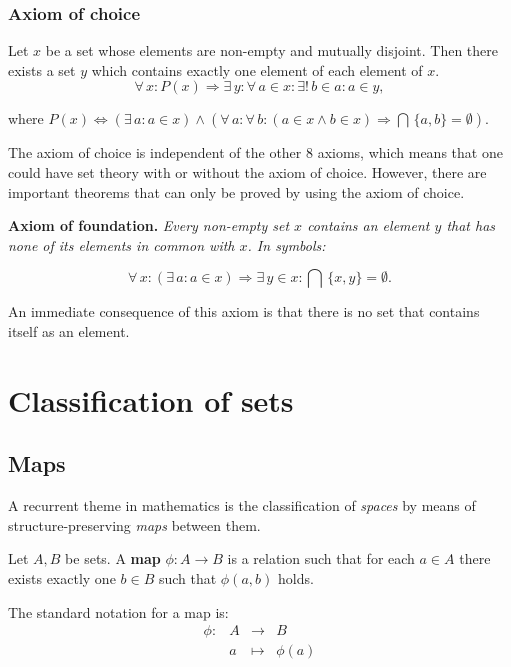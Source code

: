 \documentclass[root.tex]{subfiles}
\begin{document}
\subsection{Axiom of choice}
Let $x$ be a set whose elements are non-empty and mutually disjoint. Then there exists a set $y$ which contains exactly one element of each element of $x$.
$$
\forall \, x : P(x) \Rightarrow \exists \, y : \forall \, a \in x :\exists! \, b \in a : a \in y,
$$

where $P(x) \Leftrightarrow (\exists \,a : a \in x) \land (\forall \, a : \forall \, b : (a\in x \land b \in x) \Rightarrow \bigcap \, \{a,b\} = \emptyset )$.

\begin{remark}
The axiom of choice is independent of the other 8 axioms, which means that one could have set theory with or without the axiom of choice. However, there are important theorems that can only be proved by using the axiom of choice. 
\end{remark}

\textbf{Axiom of foundation.} \emph{Every non-empty set $x$ contains an element $y$ that has none of its elements in common with $x$. In symbols:}

$$
\forall \, x : (\exists \,a : a \in x) \Rightarrow \exists \, y \in x : \bigcap \, \{x,y\} = \emptyset .
$$

An immediate consequence of this axiom is that there is no set that contains itself as an element.\\

\chapter{Classification of sets}%

\section{Maps}%
A recurrent theme in mathematics is the classification of \emph{spaces} by means of structure-preserving \emph{maps} between them. 

\begin{mydef}
  Let $A,B$ be sets. A \textbf{map} $\phi : A \to B$ is a relation such that for each $a \in A$ there exists exactly one $b \in B$ such that $\phi(a,b)$ holds.
\end{mydef}
The standard notation for a map is:
\begin{equation}
\begin{aligned}
\phi :& A   & \to     & B\\
      & a   & \mapsto & \phi(a)
\end{aligned}
\end{equation}
\end{document}
